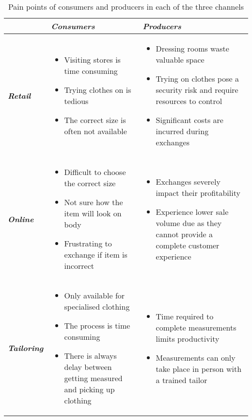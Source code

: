 \begin{table}[htbp]
	\centering
	\caption{Pain points of consumers and producers in each of the three channels}
	\begin{tabularx}{\textwidth}{|Y|Y|Y|}
		\toprule
		& 
		\textit{\textbf{Consumers}} & 
		\textit{\textbf{Producers}} \\
		\midrule
		\textit{\textbf{Retail}} & 
		\begin{itemize}
			\item Visiting stores is time consuming
			\item Trying clothes on is tedious
			\item The correct size is often not available 
		\end{itemize} & 
		\begin{itemize}
			\item Dressing rooms waste valuable space
			\item Trying on clothes pose a security risk and require resources to control
			\item Significant costs are incurred during exchanges 
		\end{itemize} \\
		\midrule
		\textit{\textbf{Online}} & 
		\begin{itemize}
			\item Difficult to choose the correct size
			\item Not sure how the item will look on body
			\item Frustrating to exchange if item is incorrect
		\end{itemize} & 
		\begin{itemize}
			\item Exchanges severely impact their profitability
			\item Experience lower sale volume due as they cannot provide a complete customer experience
		\end{itemize}\\
		\midrule
		\textit{\textbf{Tailoring}} & 
		\begin{itemize}
			\item Only available for specialised clothing
			\item The process is time consuming
			\item There is always delay between getting measured and picking up clothing
		\end{itemize} & 
		\begin{itemize}
			\item Time required to complete measurements limits productivity
			\item Measurements can only take place in person with a trained tailor
		\end{itemize} \\
		\bottomrule
	\end{tabularx}%
	\label{tab:conProdPainPoints}%
\end{table}%

